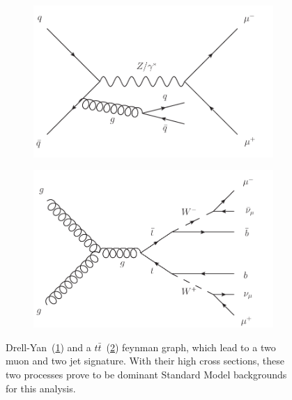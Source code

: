 \begin{figure}[htb!]
  \centering
  \begin{subfigure}[b]{0.495\textwidth}
    \centering
    \includegraphics[width=\textwidth]{plots/dyll.pdf}
    \caption{\label{fig:dyll}}
  \end{subfigure}
  \begin{subfigure}[b]{0.495\textwidth}
    \centering
    \includegraphics[width=\textwidth]{plots/ttbar.pdf}
    \caption{\label{fig:ttbar}}
  \end{subfigure}
  \caption{Drell-Yan~(\ref{fig:dyll}) and a $t\bar{t}$~(\ref{fig:ttbar}) feynman graph, which lead to a two muon and two jet signature. With their high cross sections, these two processes prove to be dominant Standard Model backgrounds for this analysis.}
  \label{fig:dyllttbar}
\end{figure}

